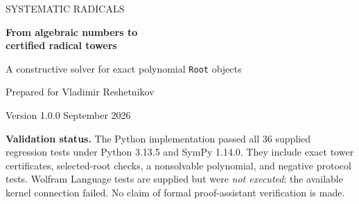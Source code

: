 \documentclass[11pt,a4paper]{article}
\theoremstyle{definition}
\theoremstyle{remark}
\newcommand{\code}[1]{\texttt{#1}}
\begin{document}
\begin{titlepage}
\vspace*{17mm}
{\Large\sffamily\color{ink}SYSTEMATIC RADICALS\par}
\vspace{7mm}
{\huge\bfseries From algebraic numbers to\\[3pt]certified radical towers\par}
\vspace{7mm}
{\large A constructive solver for exact polynomial \code{Root} objects\par}
\vspace{12mm}
{\large Prepared for Vladimir Reshetnikov\par}
{\normalsize Version 1.0.0\quad\textbullet{} September 2026\par}
\vspace{13mm}
\begin{abstract}
An exact algebraic number need not become a radical expression when passed to a
computer algebra system's usual radical converter. This is an algorithmic
limitation, not a different notion of algebraic solvability. We develop a
systematic replacement consisting of inexpensive structural reductions and a
fully specified general construction. The latter builds an abstract splitting
field, computes its automorphisms, passes to a cyclotomic base, and converts a
prime-factor composition series into a radical tower by exact Lagrange
resolvents. A separate checker validates positive certificates using rational
linear algebra and polynomial identities, without reconstructing the Galois
group. A coherent-branch theorem explains why principal radicals can represent
the entire root set without combinatorial branch guessing.

The accompanying software contains a Wolfram Language interface with native
fast paths and a self-contained Python/SymPy implementation of the general
construction. Both examples in the motivating question have particularly
small formulas: a reciprocal sextic reduces to a cubic, and a solvable quintic
is a Dickson polynomial. Completeness is an unbounded algorithmic statement;
default field-degree and time budgets deliberately allow an inconclusive
resource-limit result.
\end{abstract}
\vfill
\noindent\begin{minipage}{\textwidth}
\small\textbf{Validation status.} The Python implementation passed all 36 supplied
regression tests under Python 3.13.5 and SymPy 1.14.0. They include exact tower
certificates, selected-root checks, a nonsolvable polynomial, and negative
protocol tests. Wolfram Language tests are supplied but were \emph{not executed}:
the available kernel connection failed. No claim of formal proof-assistant
verification is made.
\end{minipage}
\end{titlepage}
\end{document}
